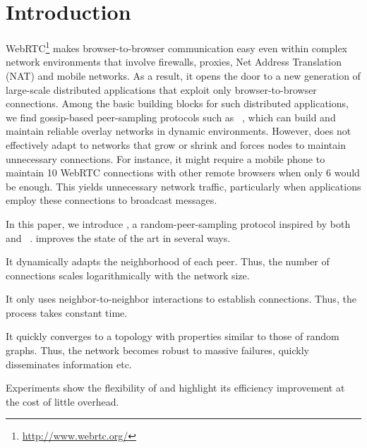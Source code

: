 
\section{Introduction}


WebRTC\footnote{\url{http://www.webrtc.org/}} makes browser-to-browser
communication easy even within complex network environments that
involve firewalls, proxies, Net Address Translation (NAT) and mobile
networks. As a result, it opens the door to a new generation of
large-scale distributed applications that exploit only
browser-to-browser connections. Among the basic building blocks for
such distributed applications, we find gossip-based peer-sampling
protocols such as \CYCLON~\cite{voulgaris2005cyclon}, which can build
and maintain reliable overlay networks in dynamic environments.
However, \CYCLON does not effectively adapt to networks that grow or
shrink and forces nodes to maintain unnecessary connections.  For
instance, it might require a mobile phone to maintain 10 WebRTC
connections with other remote browsers when only 6 would be
enough. This yields unnecessary network traffic, particularly when
applications employ these connections to broadcast messages.

In this paper, we introduce \SPRAY, a random-peer-sam\-pling protocol
inspired by both \SCAMP~\cite{ganesh2003peer} and
\CYCLON~\cite{voulgaris2005cyclon}. \SPRAY improves the state of the
art in several ways. 
\begin{inparaenum}[(i)]
\item It dynamically adapts the neighborhood of each peer. Thus, the
  number of connections scales logarithmically with the network size.
\item It only uses neighbor-to-neighbor interactions to establish
  connections. Thus, the process takes constant time.
\item It quickly converges to a topology with properties similar to
  those of random graphs. Thus, the network becomes robust to massive
  failures, quickly disseminates information etc.
\item Experiments show the flexibility of \SPRAY and highlight its
  efficiency improvement at the cost of little overhead.
\end{inparaenum}

